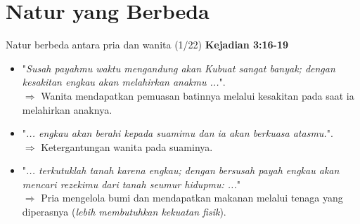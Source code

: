 \documentclass{beamer}
\theoremstyle{mystyle}
\begin{document}
\section{Natur yang Berbeda}
\begin{frame}{Natur berbeda antara pria dan wanita (1/22)}
	    \textbf{Kejadian 3:16-19}
	    \begin{itemize}
	    	\item<2-> "\textit{Susah payahmu waktu mengandung akan Kubuat sangat banyak; dengan kesakitan engkau akan melahirkan anakmu ...}". \\
	    	\onslide<3-> $\Longrightarrow$ Wanita mendapatkan pemuasan batinnya melalui kesakitan pada saat ia melahirkan anaknya.
	    	\item<4-> "\textit{... engkau akan berahi kepada suamimu dan ia akan berkuasa atasmu.}". \\
	    	\onslide<5-> $\Longrightarrow$ Ketergantungan wanita pada suaminya. \\
	    	\item<6-> "\textit{... terkutuklah tanah karena engkau; dengan bersusah payah engkau akan mencari rezekimu dari tanah seumur hidupmu: ...}" \\
	    	\onslide<7-> $\Longrightarrow$ Pria mengelola bumi dan mendapatkan makanan melalui tenaga yang diperasnya (\textit{lebih membutuhkan kekuatan fisik}).
	    \end{itemize}
\end{frame}

%		
%
%		
%		
\end{document}

